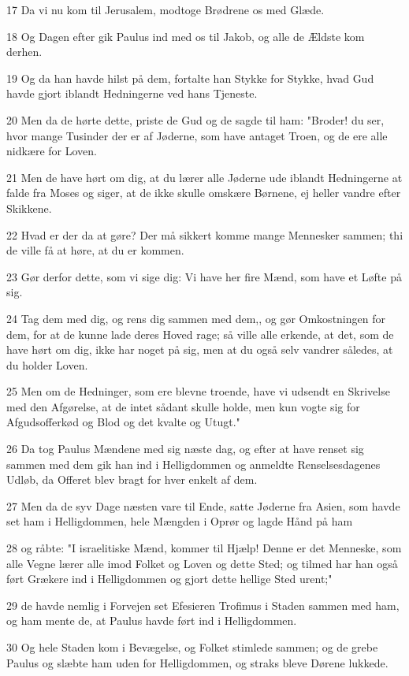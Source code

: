 \par 17 Da vi nu kom til Jerusalem, modtoge Brødrene os med Glæde.
\par 18 Og Dagen efter gik Paulus ind med os til Jakob, og alle de Ældste kom derhen.
\par 19 Og da han havde hilst på dem, fortalte han Stykke for Stykke, hvad Gud havde gjort iblandt Hedningerne ved hans Tjeneste.
\par 20 Men da de hørte dette, priste de Gud og de sagde til ham: "Broder! du ser, hvor mange Tusinder der er af Jøderne, som have antaget Troen, og de ere alle nidkære for Loven.
\par 21 Men de have hørt om dig, at du lærer alle Jøderne ude iblandt Hedningerne at falde fra Moses og siger, at de ikke skulle omskære Børnene, ej heller vandre efter Skikkene.
\par 22 Hvad er der da at gøre? Der må sikkert komme mange Mennesker sammen; thi de ville få at høre, at du er kommen.
\par 23 Gør derfor dette, som vi sige dig: Vi have her fire Mænd, som have et Løfte på sig.
\par 24 Tag dem med dig, og rens dig sammen med dem,, og gør Omkostningen for dem, for at de kunne lade deres Hoved rage; så ville alle erkende, at det, som de have hørt om dig, ikke har noget på sig, men at du også selv vandrer således, at du holder Loven.
\par 25 Men om de Hedninger, som ere blevne troende, have vi udsendt en Skrivelse med den Afgørelse, at de intet sådant skulle holde, men kun vogte sig for Afgudsofferkød og Blod og det kvalte og Utugt."
\par 26 Da tog Paulus Mændene med sig næste dag, og efter at have renset sig sammen med dem gik han ind i Helligdommen og anmeldte Renselsesdagenes Udløb, da Offeret blev bragt for hver enkelt af dem.
\par 27 Men da de syv Dage næsten vare til Ende, satte Jøderne fra Asien, som havde set ham i Helligdommen, hele Mængden i Oprør og lagde Hånd på ham
\par 28 og råbte: "I israelitiske Mænd, kommer til Hjælp! Denne er det Menneske, som alle Vegne lærer alle imod Folket og Loven og dette Sted; og tilmed har han også ført Grækere ind i Helligdommen og gjort dette hellige Sted urent;"
\par 29 de havde nemlig i Forvejen set Efesieren Trofimus i Staden sammen med ham, og ham mente de, at Paulus havde ført ind i Helligdommen.
\par 30 Og hele Staden kom i Bevægelse, og Folket stimlede sammen; og de grebe Paulus og slæbte ham uden for Helligdommen, og straks bleve Dørene lukkede.
